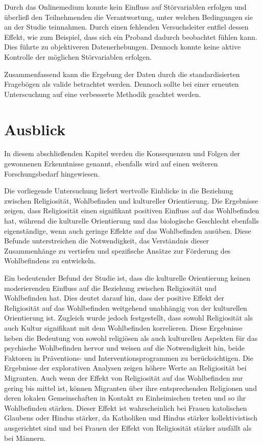Durch das Onlinemedium konnte kein Einfluss auf Störvariablen erfolgen und überließ den Teilnehmenden die Verantwortung, unter welchen Bedingungen sie an der Studie teinnahmen. Durch einen fehlenden Versuchsleiter entfiel dessen Effekt, wie zum Beispiel, dass sich ein Proband dadurch beobachtet fühlen kann. Dies führte zu objektiveren Datenerhebungen. Dennoch konnte keine aktive Kontrolle der möglichen Störvariablen erfolgen.

Zusammenfassend kann die Ergebung der Daten durch die standardisierten Fragebögen als valide betrachtet werden. Dennoch sollte bei einer erneuten Unterscuchung auf eine verbesserte Methodik geachtet werden.






\section{Ausblick}  \label{sec5.4}
In diesem abschließenden Kapitel werden die Konsequenzen und Folgen der gewonnenen Erkenntnisse genannt, ebenfalls wird auf einen weiteren Forschungsbedarf hingewiesen.

Die vorliegende Untersuchung liefert wertvolle Einblicke in die Beziehung zwischen Religiosität, Wohlbefinden und kultureller Orientierung. Die Ergebnisse zeigen, dass Religiosität einen signifikant positiven Einfluss auf das Wohlbefinden hat, während die kulturelle Orientierung und das biologische Geschlecht ebenfalls eigenständige, wenn auch geringe Effekte auf das Wohlbefinden ausüben. Diese Befunde unterstreichen die Notwendigkeit, das Verständnis dieser Zusammenhänge zu vertiefen und spezifische Ansätze zur Förderung des Wohlbefindens zu entwickeln.

Ein bedeutender Befund der Studie ist, dass die kulturelle Orientierung keinen moderierenden Einfluss auf die Beziehung zwischen Religiosität und Wohlbefinden hat. Dies deutet darauf hin, dass der positive Effekt der Religiosität auf das Wohlbefinden weitgehend unabhängig von der kulturellen Orientierung ist. Zugleich wurde jedoch festgestellt, dass sowohl Religiosität als auch Kultur signifikant mit dem Wohlbefinden korrelieren. Diese Ergebnisse heben die Bedeutung von sowohl religiösen als auch kulturellen Aspekten für das psychische Wohlbefinden hervor und weisen auf die Notwendigkeit hin, beide Faktoren in Präventions- und Interventionsprogrammen zu berücksichtigen.
Die Ergebnisse der explorativen Analysen zeigen höhere Werte an Religiosität bei Migranten. Auch wenn der Effekt von Religiosität auf das Wohlbefinden nur gering bis mittel ist, können Migranten über ihre entsprechenden Religionen und deren lokalen Gemeinschaften in Kontakt zu Einheimischen treten und so ihr Wohlbefinden stärken. Dieser Effekt ist wahrscheinlich bei Frauen katolischen Glaubens oder Hindus stärker, da Katholiken und Hindus stärker kollektivistisch ausgerichtet sind und bei Frauen der Effekt von Religiosität stärker ausfällt als bei Männern.

